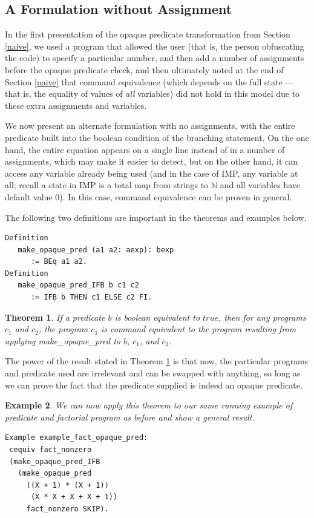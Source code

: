 \documentclass[compsoc,conference,a4paper,10pt,times]{IEEEtran}
\newtheorem{theorem}{Theorem}[section]
\newtheorem{example}[theorem]{Example}
\begin{document}
\subsection{A Formulation without Assignment}\label{noass}
In the first presentation of the opaque predicate transformation from Section \ref{naive}, we used a program that allowed
the user (that is, the person obfuscating the code) to specify a particular number, and then add a number of assignments before the
opaque predicate check, and then ultimately noted at the end of Section \ref{naive} that command equivalence (which depends on the full state --- that is, the equality of values of \emph{all} variables) did not
hold in this model due to these extra assignments and variables.
\par
We now present an alternate formulation with no assignments, with the entire predicate
built into the boolean condition of the branching statement. On the one hand, the entire
equation appears on a single line instead of in a number of assignments, which may make it
easier to detect, but on the other hand, it can access any variable already being used (and
in the case of IMP, any variable at all; recall a state in IMP is a total map
from strings to $\mathbb{N}$ and all variables have default value 0).  In this case, command equivalence can be proven in general.

The following two definitions are important in the theorems and examples below.
\begin{verbatim}
Definition 
   make_opaque_pred (a1 a2: aexp): bexp 
      := BEq a1 a2.
Definition 
   make_opaque_pred_IFB b c1 c2 
      := IFB b THEN c1 ELSE c2 FI.
\end{verbatim}

\begin{theorem}\label{generalcequiv}
If a predicate $b$ is boolean equivalent to $true$, then for any programs $c_1$ and $c_2$,
the program $c_1$ is command equivalent to the program resulting from applying \textit{make\_opaque\_pred}
to $b$, $c_1$, and $c_2$. 
\end{theorem}

The power of the result stated in Theorem \ref{generalcequiv}
is that now, the particular programs and predicate used are irrelevant and can be swapped with anything, so long as we can prove the fact that the predicate supplied is indeed an opaque predicate. 

\begin{example}\label{factopaqueex}
We can now apply this theorem to our same running example of predicate and factorial program as before and show a general result.
\begin{verbatim}
Example example_fact_opaque_pred: 
 cequiv fact_nonzero 
 (make_opaque_pred_IFB 
   (make_opaque_pred 
     ((X + 1) * (X + 1)) 
      (X * X + X + X + 1)) 
     fact_nonzero SKIP).
\end{verbatim}
\end{example}
\end{document}
